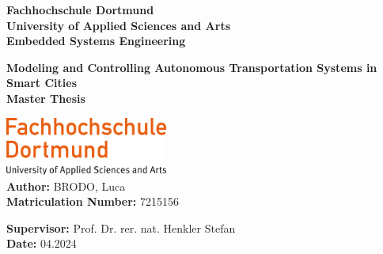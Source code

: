 \begin{titlepage}
	\begin{center}
    \centering
    \vspace*{0.5cm}
    \Large
    \textbf{Fachhochschule Dortmund} \\
    \textbf{University of Applied Sciences and Arts} \\
    \textbf{Embedded Systems Engineering}\\
	\centering
	

    \vspace{2cm}

    \LARGE
    \textbf{Modeling and Controlling Autonomous Transportation Systems in Smart Cities} \\
     \vspace{1cm}
    \textbf{Master Thesis}



   
    \vspace{3cm}
	
	\centering
    \includegraphics[width=0.4\textwidth]{assets/img/01_title/FH_Dortmund-logo.svg.png}\\ 
    \vspace{3.5cm}
    \large
	\textbf{Author:} \hspace{0.5cm} BRODO, Luca\\
	\textbf{Matriculation Number:} \hspace{0.5cm} 7215156
	    
   

    \textbf{Supervisor:} \hspace{0.5cm} Prof. Dr. rer. nat. Henkler Stefan \\
    \textbf{Date:} \hspace{0.5cm} 04.2024

    \vfill
    \vspace{1cm}
\end{center}
\end{titlepage}

\restoregeometry
